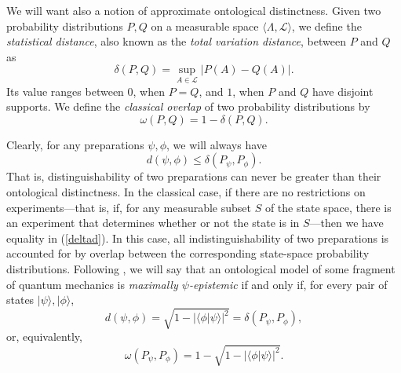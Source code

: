 \documentclass[12pt]{article}
\newcommand{\ket}[1]{|#1\rangle}
\newcommand{\bkt}[2]{\langle#1|#2\rangle}
\newcommand{\mc}{\mathcal}
\begin{document}
We will want also a notion of approximate ontological distinctness.  Given two probability distributions $P, Q$ on a measurable space $\langle \Lambda, \mc{L} \rangle$, we define the \emph{statistical distance}, also known as the \emph{total variation distance}, between $P$ and $Q$ as
\begin{equation}
\delta(P, Q) = \sup_{A \in \mc{L}} \left|P(A) - Q(A) \right|.
\end{equation}
Its value ranges between 0, when $P = Q$, and $1$, when $P$ and $Q$ have disjoint supports.  We define the \emph{classical overlap} of two probability distributions by
\begin{equation}
\omega(P, Q) = 1 - \delta(P, Q).
\end{equation}

Clearly, for any preparations $\psi, \phi$, we will always have
\begin{equation}\label{deltad}
d(\psi, \phi) \leq \delta(P_\psi, P_\phi).
\end{equation}
That is, distinguishability of two preparations can never be greater than their ontological distinctness. In the classical case, if there are no restrictions on experiments---that is, if, for any measurable subset $S$ of the state space, there is an experiment that determines whether or not the state is in $S$---then we have equality in (\ref{deltad}).  In this case, all indistinguishability of two preparations is accounted for by overlap between the corresponding state-space probability distributions.  Following \citet{BCLM}, we will say that an ontological model of some fragment of quantum mechanics is \emph{maximally $\psi$-epistemic} if and only if, for every pair of states $\ket{\psi}, \ket{\phi}$,
\begin{equation}\label{MaxEpist}
d(\psi, \phi) = \sqrt{1 - |\bkt{\phi}{\psi}|^2} = \delta(P_\psi, P_\phi),
\end{equation}
or, equivalently,
\begin{equation}
\omega(P_\psi, P_\phi) = 1 -   \sqrt{1 - |\bkt{\phi}{\psi}|^2}.
\end{equation}
\end{document}
